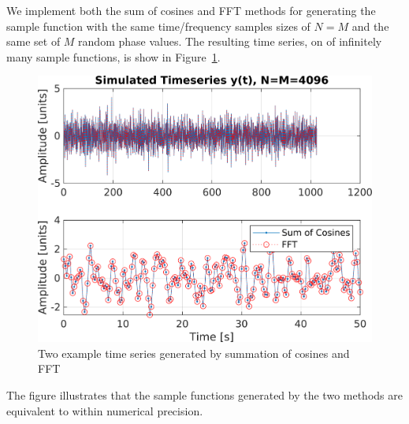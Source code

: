 \documentclass[techreport, article]{npsreport2018}
\begin{document}
We implement both the sum of cosines and FFT methods for generating the sample function with the same time/frequency samples sizes of $N=M$ and the same set of $M$ random phase values.  The resulting time series, on of infinitely many sample functions, is show in Figure~\ref{f:timeseries}. 
\begin{figure}[hbt!]
  \centering
  \includegraphics[width=\FigWidth\textwidth]{images/timeseries.png}
  \caption{Two example time series generated by summation of cosines and FFT}
  \label{f:timeseries}
\end{figure}
The figure illustrates that the sample functions generated by the two methods are equivalent to within numerical precision.
\end{document}
